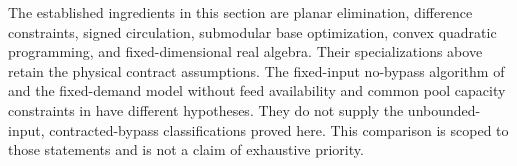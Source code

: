 The established ingredients in this section are planar elimination,
difference constraints, signed circulation, submodular base optimization,
convex quadratic programming, and fixed-dimensional real algebra. Their
specializations above retain the physical contract assumptions. The
fixed-input no-bypass algorithm of \citet[Theorem~1]{s4:boland2017}
and the fixed-demand model without feed availability and common pool
capacity constraints in \citet[Assumption~2.2]{s3:baltean2018} have
different hypotheses. They do not supply the unbounded-input,
contracted-bypass classifications proved here. This comparison is scoped
to those statements and is not a claim of exhaustive priority.
